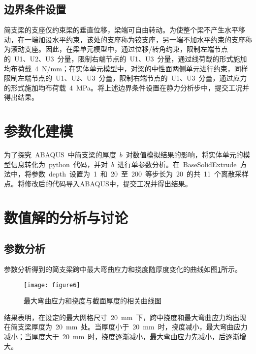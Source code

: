 \subsection{边界条件设置}
简支梁的支座仅约束梁的垂直位移，梁端可自由转动。为使整个梁不产生水平移动，在一端加设水平约束，该处的支座称为铰支座，另一端不加水平约束的支座称为滚动支座。因此，在梁单元模型中，通过位移/转角约束，限制左端节点的~U1、U2、U3~分量，限制右端节点的~U1、U3~分量\cite{gajdosova2018influence}，通过线荷载的形式施加均布荷载~4~N/mm；在实体单元模型中，对梁的中性面两侧单元进行约束\cite{JGXB201402012}，同样限制左端节点的~U1、U2、U3~分量，限制右端节点的~U1、U3~分量，通过应力的形式施加均布荷载~4~MPa。将上述边界条件设置在静力分析步中，提交工况并得出结果。
\section{参数化建模}
为了探究~ABAQUS~中简支梁的厚度~$b$~对数值模拟结果的影响，将实体单元的模型信息转化为~python~代码，并对~$b$~进行单参数分析\cite{radon2015study,liu2016review}。在~BaseSolidExtrude~方法中，将参数~depth~设置为~1~和~20~至~200~等步长为~20~的共~11~个离散采样点\cite{fu2019recent}。将修改后的代码导入ABAQUS中，提交工况并得出结果。
\section{数值解的分析与讨论}
\subsection{参数分析}
参数分析得到的简支梁跨中最大弯曲应力和挠度随厚度变化的曲线如图\ref{fig:para}所示。
\begin{figure}[htbp]
    \centering
	\texttt{[image: figure6]}
    \caption{最大弯曲应力和挠度与截面厚度的相关曲线图}
    \label{fig:para}
\end{figure}
结果表明，在设定的最大网格尺寸~20~mm~下，跨中挠度和最大弯曲应力均出现在简支梁厚度为~20~mm~处。当厚度小于~20~mm~时，挠度减小，最大弯曲应力减小；当厚度大于~20~mm~时，挠度逐渐减小，最大弯曲应力先减小，后逐渐增大。

